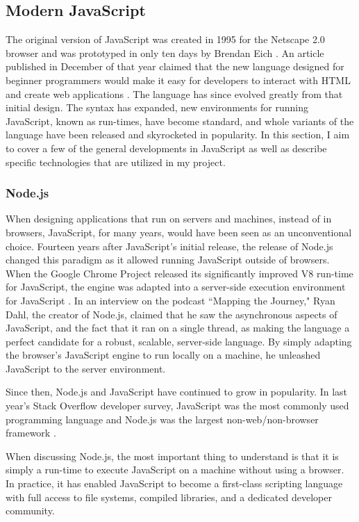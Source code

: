 \subsection{Modern JavaScript}

The original version of JavaScript was created in 1995 for the Netscape 2.0 browser and was prototyped in only ten days by Brendan Eich \cite{redhatinc.CreatingJavaScript}.  An article published in December of that year claimed that the new language designed for beginner programmers would make it easy for developers to interact with HTML and create web applications \cite{bucholtzNewLanguageAims1995}.  The language has since evolved greatly from that initial design.  The syntax has expanded, new environments for running JavaScript, known as run-times, have become standard, and whole variants of the language have been released and skyrocketed in popularity.  In this section, I aim to cover a few of the general developments in JavaScript as well as describe specific technologies that are utilized in my project.

\subsubsection{Node.js}
When designing applications that run on servers and machines, instead of in browsers, JavaScript, for many years, would have been seen as an unconventional choice.  Fourteen years after JavaScript's initial release, the release of Node.js changed this paradigm as it allowed running JavaScript outside of browsers. When the Google Chrome Project released its significantly improved V8 run-time for JavaScript, the engine was adapted into a server-side execution environment for JavaScript \cite{pramodEpisodeInterviewRyan}.  In an interview on the podcast ``Mapping the Journey," Ryan Dahl, the creator of Node.js, claimed that he saw the asynchronous aspects of JavaScript, and the fact that it ran on a single thread, as making the language a perfect candidate for a robust, scalable, server-side language.  By simply adapting the browser's JavaScript engine to run locally on a machine, he unleashed JavaScript to the server environment.

Since then, Node.js and JavaScript have continued to grow in popularity. In last year's Stack Overflow developer survey, JavaScript was the most commonly used programming language and Node.js was the largest non-web/non-browser framework \cite{stackoverflowStackOverflowDeveloper}.

When discussing Node.js, the most important thing to understand is that it is simply a run-time to execute JavaScript on a machine without using a browser.  In practice, it has enabled JavaScript to become a first-class scripting language with full access to file systems, compiled libraries, and a dedicated developer community.

